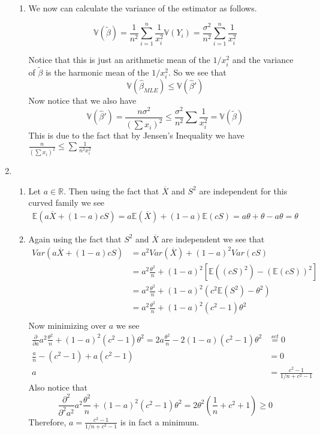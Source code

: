 \documentclass[12pt]{article}  %
\newcommand{\R}{{\mathbb{R}}}
\newcommand{\E}{{\mathbb{E}}}
\begin{document}
\begin{enumerate}
\begin{enumerate}
\item We now can calculate the variance of the estimator as follows. 

$$\mathbb{V}(\tilde{\beta}) = \frac{1}{n^2}\sum_{i=1}^n\frac{1}{x_i^2}\mathbb{V}(Y_i) = \frac{\sigma^2}{n^2}\sum_{i=1}^n \frac{1}{x_i^2}$$

Notice that this is just an arithmetic mean of the $1/x_i^2$ and the variance of $\tilde{\beta}$ is the harmonic mean of the $1/x_i^2$. So we see that $$\mathbb{V}(\hat{\beta}_{MLE})\leq \mathbb{V}(\hat{\beta}')$$ Now notice that we also have $$\mathbb{V}(\hat{\beta}') = \frac{n\sigma^2}{\left(\sum x_i\right)^2}\leq \frac{\sigma^2}{n^2}\sum\frac{1}{x_i^2} = \mathbb{V}(\tilde{\beta})$$  This is due to the fact that by Jensen's Inequality we have $\frac{n}{(\sum x_i)^2}\leq \sum\frac{1}{n^2x_i^2}$
\end{enumerate}

\item 
\begin{enumerate}
\item Let $a\in\R$. Then using the fact that $\overline{X}$ and $S^2$ are independent for this curved family we see
\begin{align*}
\E(a\overline{X} + (1 - a)cS) = a\E(\overline{X}) + (1-a)\E(cS) = a\theta + \theta - a\theta = \theta
\end{align*}
\item Again using the fact that $S^2$ and $\overline{X}$ are independent we see that
\begin{align*}
Var(a\overline{X} + (1 - a)cS) &= a^2Var(\overline{X}) + (1-a)^2Var(cS)\\ 
&= a^2\frac{\theta^2}{n} + (1-a)^2\left[\E((cS)^2) - (\E(cS))^2\right]\\
&= a^2\frac{\theta^2}{n} + (1-a)^2(c^2\E(S^2)-\theta^2)\\
&= a^2\frac{\theta^2}{n} + (1-a)^2(c^2-1)\theta^2\\
\end{align*}
Now minimizing over $a$ we see 
\begin{align*}
\frac{\partial}{\partial a}a^2\frac{\theta^2}{n} + (1-a)^2(c^2-1)\theta^2 = 2a\frac{\theta^2}{n} - 2(1-a)(c^2-1)\theta^2 &\overset{set}{=}0\\
\frac{a}{n} - (c^2-1) + a(c^2-1) &= 0 \\
a &= \frac{c^2 - 1}{1/n + c^2 - 1}
\end{align*}
Also notice that $$\frac{\partial^2}{\partial^2a^2}a^2\frac{\theta^2}{n} + (1-a)^2(c^2-1)\theta^2 = 2\theta^2(\frac{1}{n}+c^2+1)\geq 0$$ Therefore, $a = \frac{c^2 - 1}{1/n + c^2 - 1}$ is in fact a minimum.


\end{enumerate}
\end{enumerate}
\end{document}
